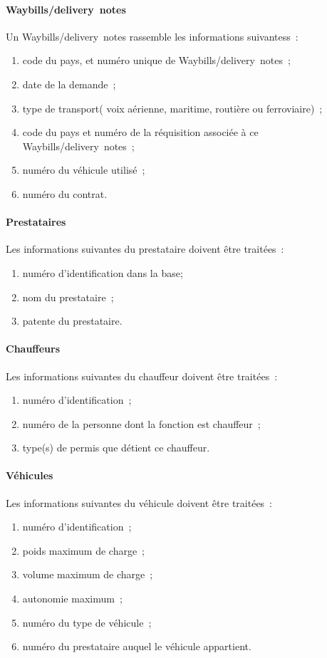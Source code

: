 \paragraph{Waybills/delivery~notes}
Un Waybills/delivery~notes rassemble les informations suivantess~:
\begin{enumerate}
	\item code du pays, et numéro unique de Waybills/delivery~notes~;
	\item date de la demande~;
	\item type de transport( voix aérienne, maritime, routière ou ferroviaire)~;
	\item code du pays et numéro de la réquisition associée à ce Waybills/delivery~notes~; 
	\item numéro du véhicule utilisé~; 
	\item numéro du contrat.
	\end{enumerate}
\paragraph{Prestataires}
Les informations suivantes du prestataire doivent être traitées~:
\begin{enumerate}
	\item numéro d'identification dans la base;
	\item nom du prestataire~;
	\item patente  du prestataire.
	\end{enumerate}
	
\paragraph{Chauffeurs}
Les informations suivantes du chauffeur doivent être traitées~:

\begin{enumerate}
	\item numéro d'identification~;
	\item numéro de la personne dont la fonction est chauffeur~;
	\item type(s) de permis que détient ce chauffeur. 
	\end{enumerate}
	
\paragraph{Véhicules}
Les informations suivantes du véhicule doivent être traitées~:

\begin{enumerate}
	\item numéro d'identification~;
	\item poids maximum de charge~;
	\item volume maximum de charge~;
	\item autonomie maximum~;
	\item numéro du type de véhicule~;
	\item numéro du prestataire auquel le véhicule appartient.
	\end{enumerate}
	
